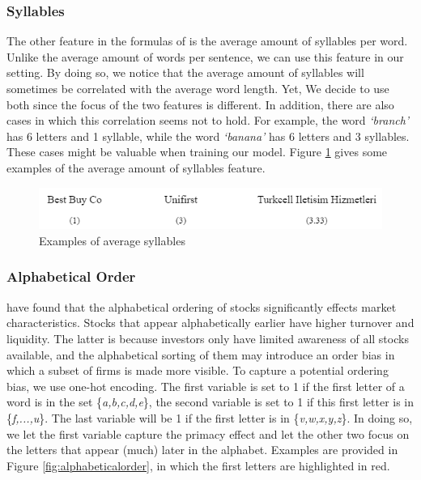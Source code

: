 \documentclass[11pt]{article}
\begin{document}
\subsubsection{Syllables}
The other feature in the formulas of \cite{kincaid1975derivation} is the average amount of syllables per word. Unlike the average amount of words per sentence, we can use this feature in our setting. By doing so, we notice that the average amount of syllables will sometimes be correlated with the average word length. Yet, We decide to use both since the focus of the two features is different. In addition, there are also cases in which this correlation seems not to hold. For example, the word \textit{`branch'} has 6 letters and 1 syllable, while the word \textit{`banana'} has 6 letters and 3 syllables. These cases might be valuable when training our model. Figure \ref{fig:averagesyllables} gives some examples of the average amount of syllables feature.

\vspace{0.5cm}
\begin{figure}[h]
    \centering
    \includegraphics[scale=0.6]{figures/average_syllables.png}
    \caption{Examples of average syllables}
    \label{fig:averagesyllables}
\end{figure}
\vspace{0.5cm}










\subsubsection{Alphabetical Order}
\cite{jacobs2016alphabetic} have found that the alphabetical ordering of stocks significantly effects market characteristics. Stocks that appear alphabetically earlier  have higher turnover and liquidity. The latter is because investors only have limited awareness of all stocks available, and the alphabetical sorting of them may introduce an order bias in which a subset of firms is made more visible. To capture a potential ordering bias, we use one-hot encoding. The first variable is set to 1 if the first letter of a word is in the set \{\textit{a,b,c,d,e}\}, the second variable is set to 1 if this first letter is in \{\textit{f,...,u}\}. The last variable will be 1 if the first letter is in \{\textit{v,w,x,y,z}\}. In doing so, we let the first variable capture the primacy effect and let the other two focus on the letters that appear (much) later in the alphabet. Examples are provided in Figure \ref{fig:alphabeticalorder}, in which the first letters are highlighted in red.
\end{document}
